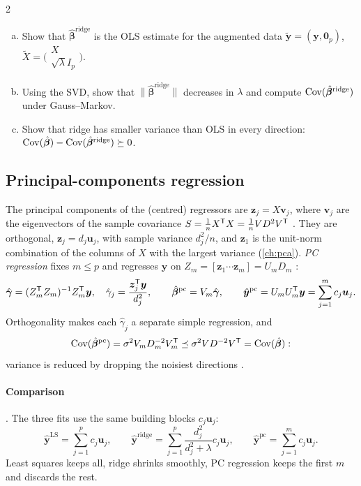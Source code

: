 \begin{paracol}{2}
\begin{exercise}
\leavevmode
\begin{enumerate}[(a)]
  \item Show that $\hat{\bm\beta}^{\text{ridge}}$ is the OLS estimate for the augmented data $\tilde{\bm y}=(\bm y,\bm 0_p)$,
      $\tilde X=\bigl(\begin{smallmatrix}X\\ \sqrt\lambda I_p\end{smallmatrix}\bigr)$.
  \item Using the SVD, show that $\|\hat{\bm\beta}^{\text{ridge}}\|$ decreases in $\lambda$ and compute
      $\operatorname{Cov}(\hat{\bm\beta}^{\text{ridge}})$ under Gauss--Markov.
  \item Show that ridge has smaller variance than OLS in every direction:
      $\operatorname{Cov}(\hat{\bm\beta})-\operatorname{Cov}(\hat{\bm\beta}^{\text{ridge}})\succeq0$.
\end{enumerate}
\end{exercise}

\subsection{Principal-components regression}
The principal components of the (centred) regressors are $\bm z_j=X\bm v_j$, where $\bm v_j$ are the eigenvectors of the
sample covariance $S=\frac1nX^{\mathsf T} X=\frac1nVD^2V^{\mathsf T}$ . They are orthogonal, $\bm z_j=d_j\bm u_j$, with sample
variance $d_j^2/n$, and $\bm z_1$ is the unit-norm combination of the columns of $X$ with the largest variance
(\cref{ch:pca}). \emph{PC regression} fixes $m\le p$ and regresses $\bm y$ on $Z_m=[\bm z_1\cdots\bm z_m]=U_mD_m$
:
\[
  \hat{\bm\gamma}=(Z_m^{\mathsf T} Z_m)^{-1}Z_m^{\mathsf T}\bm y,\quad \hat\gamma_j=\frac{\bm z_j^{\mathsf T}\bm y}{d_j^2},\qquad
  \hat{\bm\beta}^{\text{pc}}=V_m\hat{\bm\gamma},\qquad \hat{\bm y}^{\text{pc}}=U_mU_m^{\mathsf T}\bm y=\sum_{j=1}^mc_j\bm u_j .
\]
Orthogonality makes each $\hat\gamma_j$ a separate simple regression, and
\[\operatorname{Cov}(\hat{\bm\beta}^{\text{pc}})=\sigma^2V_mD_m^{-2}V_m^{\mathsf T}\preceq\sigma^2VD^{-2}V^{\mathsf T}=\operatorname{Cov}(\hat{\bm\beta}):\]
variance is reduced by dropping the noisiest
directions .

\paragraph{Comparison} . The three fits use the same building blocks $c_j\bm u_j$:
\[
  \hat{\bm y}^{\text{LS}}=\sum_{j=1}^pc_j\bm u_j,\qquad
  \hat{\bm y}^{\text{ridge}}=\sum_{j=1}^p\frac{d_j^2}{d_j^2+\lambda}c_j\bm u_j,\qquad
  \hat{\bm y}^{\text{pc}}=\sum_{j=1}^mc_j\bm u_j .
\]
Least squares keeps all, ridge shrinks smoothly, PC regression keeps the first $m$ and discards the rest.


\end{paracol}
